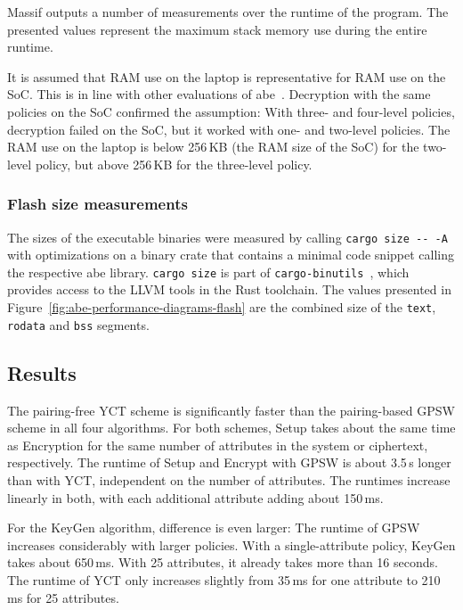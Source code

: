 Massif outputs a number of measurements over the runtime of the program. 
The presented values represent the maximum stack memory use during the entire runtime.

It is assumed that RAM use on the laptop is representative for RAM use on the SoC.
This is in line with other evaluations of \acrshort{abe}~\cite{borgh_attribute-based_2016}. 
Decryption with the same policies on the SoC confirmed the assumption:
With three- and four-level policies, decryption failed on the SoC, but it worked with one- and two-level policies.
The RAM use on the laptop is below 256\,KB (the RAM size of the SoC) for the two-level policy, but above 256\,KB for the three-level policy.

\subsubsection{Flash size measurements}


The sizes of the executable binaries were measured by calling \verb+cargo size -- -A+ with optimizations on a binary crate that contains a minimal code snippet calling the respective \acrshort{abe} library.
\verb+cargo size+ is part of \verb+cargo-binutils+~\cite{noauthor_cargo-binutils_nodate}, which provides access to the LLVM tools in the Rust toolchain.
The values presented in Figure~\ref{fig:abe-performance-diagrams-flash} are the combined size of the \texttt{text}, \texttt{rodata} and \texttt{bss} segments.


\subsection{Results}
The pairing-free YCT scheme is significantly faster than the pairing-based GPSW scheme in all four algorithms. 
For both schemes, Setup takes about the same time as Encryption for the same number of attributes in the system or ciphertext, respectively.
The runtime of Setup and Encrypt with GPSW is about 3.5\,s longer than with YCT, independent on the number of attributes.
The runtimes increase linearly in both, with each additional attribute adding about 150\,ms.

For the KeyGen algorithm, difference is even larger:
The runtime of GPSW increases considerably with larger policies.
With a single-attribute policy, KeyGen takes about 650\,ms. With 25 attributes, it already takes more than 16 seconds.
The runtime of YCT only increases slightly from 35\,ms for one attribute to 210\,ms for 25 attributes.

